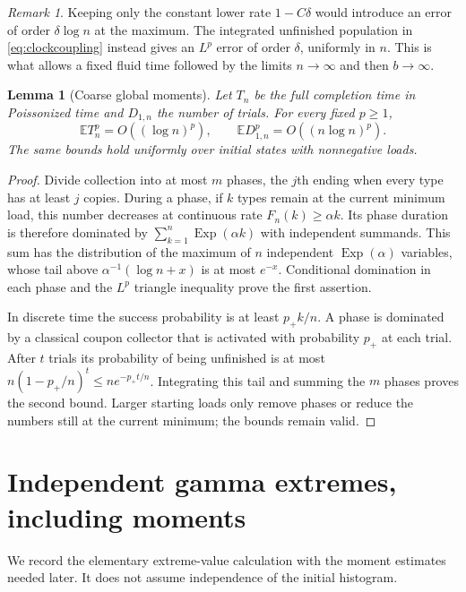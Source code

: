 \documentclass[11pt]{article}
\newtheorem{lemma}[theorem]{Lemma}
\theoremstyle{remark}\newtheorem{remark}[theorem]{Remark}
\newcommand{\Ebb}{\mathbb E}
\begin{document}
\begin{remark}
Keeping only the constant lower rate $1-C\delta$ would introduce an error
of order $\delta\log n$ at the maximum. The integrated unfinished population
in \eqref{eq:clockcoupling} instead gives an $L^p$ error of order $\delta$,
uniformly in $n$. This is what allows a fixed fluid time followed by the
limits $n\to\infty$ and then $b\to\infty$.
\end{remark}

\begin{lemma}[Coarse global moments]\label{lem:coarse}
Let $T_n$ be the full completion time in Poissonized time and $D_{1,n}$ the
number of trials. For every fixed $p\ge1$,
\begin{equation}\label{eq:coarse}
 \Ebb T_n^p=O((\log n)^p),\qquad
 \Ebb D_{1,n}^p=O((n\log n)^p).
\end{equation}
The same bounds hold uniformly over initial states with nonnegative loads.
\end{lemma}
\begin{proof}
Divide collection into at most $m$ phases, the $j$th ending when every type
has at least $j$ copies. During a phase, if $k$ types remain at the current
minimum load, this number decreases at continuous rate $F_n(k)\ge\alpha k$.
Its phase duration is therefore dominated by
$\sum_{k=1}^n\operatorname{Exp}(\alpha k)$ with independent summands.
This sum has the distribution of the maximum of $n$ independent
$\operatorname{Exp}(\alpha)$ variables, whose tail above
$\alpha^{-1}(\log n+x)$ is at most $e^{-x}$. Conditional domination in each
phase and the $L^p$ triangle inequality prove the first assertion.

In discrete time the success probability is at least $p_+k/n$.
A phase is dominated by a classical coupon collector that is activated with
probability $p_+$ at each trial. After $t$ trials its probability of being
unfinished is at most $n(1-p_+/n)^t\le ne^{-p_+t/n}$.
Integrating this tail and summing the $m$ phases proves the second bound.
Larger starting loads only remove phases or reduce the numbers still at
the current minimum; the bounds remain valid.
\end{proof}

\section{Independent gamma extremes, including moments}
We record the elementary extreme-value calculation with the moment
estimates needed later. It does not assume independence of the initial
histogram.
\end{document}
